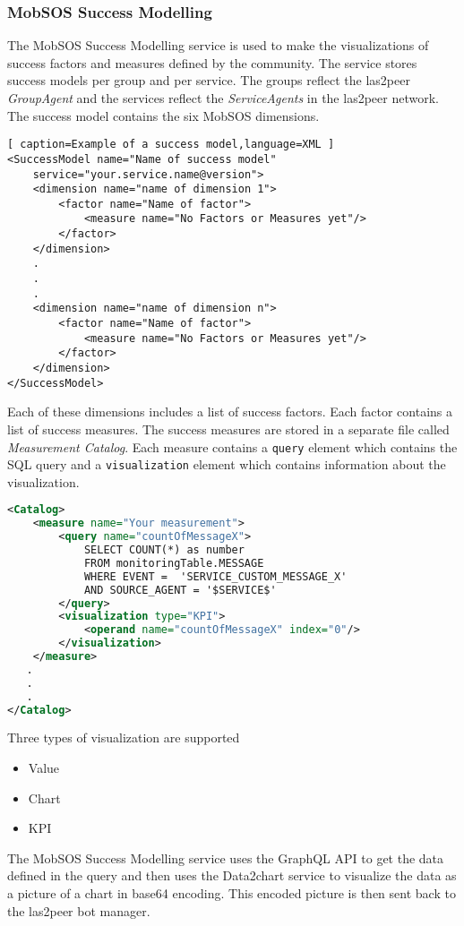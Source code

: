\subsubsection{MobSOS Success Modelling}
The MobSOS Success Modelling service is used to make the visualizations of success factors and measures defined by the community. The service stores success models per group and per service. 
The groups reflect the las2peer \emph{GroupAgent} and the services reflect the \emph{ServiceAgents} in the las2peer network.
The success model contains the six MobSOS dimensions.
\begin{lstlisting}[ caption=Example of a success model,language=XML ]
<SuccessModel name="Name of success model" 
    service="your.service.name@version">
    <dimension name="name of dimension 1">
        <factor name="Name of factor">
            <measure name="No Factors or Measures yet"/>
        </factor>
    </dimension>
    .
    .
    .
    <dimension name="name of dimension n">
        <factor name="Name of factor">
            <measure name="No Factors or Measures yet"/>
        </factor>
    </dimension>
</SuccessModel>
\end{lstlisting}
Each of these dimensions includes a list of success factors.
Each factor contains a list of success measures. The success measures are stored in a separate file called \emph{Measurement Catalog}. Each measure contains a \texttt{query} element which contains the SQL query and a \texttt{visualization} element which contains information about the visualization.
\begin{lstlisting}[language=XML, caption= example of a Measure Catalog]
<Catalog>
    <measure name="Your measurement">
        <query name="countOfMessageX">
            SELECT COUNT(*) as number 
            FROM monitoringTable.MESSAGE
            WHERE EVENT =  'SERVICE_CUSTOM_MESSAGE_X' 
            AND SOURCE_AGENT = '$SERVICE$'
        </query>
        <visualization type="KPI">
            <operand name="countOfMessageX" index="0"/>
        </visualization>
    </measure>
   .
   .
   .
</Catalog>
\end{lstlisting}
Three types of visualization are supported
\begin{itemize}
    \item Value
    \item Chart
    \item KPI
\end{itemize}
The MobSOS Success Modelling service uses the GraphQL API to get the data defined in the query and then uses the Data2chart service to visualize the data as a picture of a chart in base64 encoding. This encoded picture is then sent back to the las2peer bot manager.

